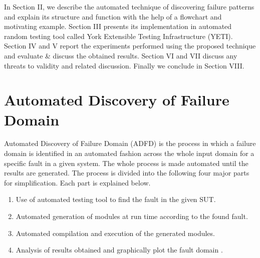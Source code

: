 \documentclass{acm_proc_article-sp}
\begin{document}
In Section II, we describe the automated technique of  discovering failure patterns and explain its structure and function with the help of a flowchart and motivating example. Section III presents its implementation in automated random testing tool called York Extensible Testing Infrastructure (YETI). Section IV and V report the experiments performed using the proposed technique and evaluate \& discuss the obtained results. Section VI and VII discuss any threats to validity and related discussion. Finally we conclude in Section VIII. 

 
\section{Automated Discovery of Failure Domain}

Automated Discovery of Failure Domain (ADFD) is the process in which a failure domain is identified in an automated fashion across the whole input domain for a specific fault in a given system. The whole process is made automated until the results are generated. The process is divided into the following four major parts for simplification. Each part is explained below.
\begin{enumerate}
\item Use of automated testing tool to find the fault in the given SUT.
\item Automated generation of modules at run time according to the found fault.
\item Automated compilation and execution of the generated modules.
\item Analysis of results obtained and graphically plot the fault domain .\\
\end{enumerate}
\end{document}
